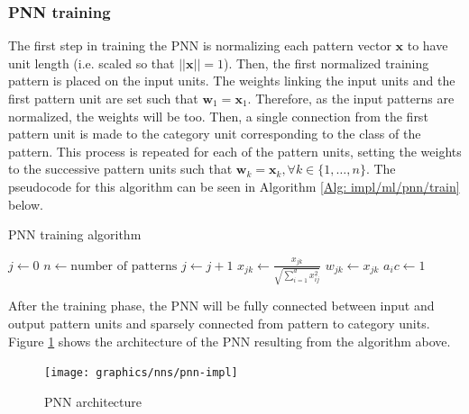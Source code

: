 	\subsubsection*{PNN training}
	The first step in training the PNN is normalizing each pattern vector $\mathbf{x}$ to have unit length (i.e. scaled so that $\vert\vert \mathbf{x}\vert\vert = 1$). Then, the first normalized training pattern is placed on the input units. The weights linking the input units and the first pattern unit are set such that $\mathbf{w}_1 = \mathbf{x}_1$. Therefore, as the input patterns are normalized, the weights will be too. Then, a single connection from the first pattern unit is made to the category unit corresponding to the class of the pattern. This process is repeated for each of the pattern units, setting the weights to the successive pattern units such that $\mathbf{w}_k=\mathbf{x}_k, \forall k \in \{1,\dots,n \}$. The pseudocode for this algorithm can be seen in Algorithm \ref{Alg: impl/ml/pnn/train} below.
	\begin{algorithm}[H]
		\caption{PNN training algorithm}
		\label{Alg: impl/ml/pnn/train}
		\begin{algorithmic}
				\State $j \gets 0$
				\State $n \gets \text{number of patterns}$ 
				\Do
					\State $j \gets j + 1$
					\State $x_{jk} \gets \frac{x_{jk}}{\sqrt{\sum_{i=1}^{d}x_{ij}^2}}$ 
					\State $w_{jk} \gets x_{jk}$ 
						\State $a_ic \gets 1$
					\EndIf
			\EndProcedure
		\end{algorithmic}
	\end{algorithm}
	After the training phase, the PNN will be fully connected between input and output pattern units and sparsely connected from pattern to category units. Figure \ref{Fig: impl/ml/pnn/architecture} shows the architecture of the PNN resulting from the algorithm above.
	\begin{figure}[H]
		\centering
		\texttt{[image: graphics/nns/pnn-impl]}
		\caption{PNN architecture}
		\label{Fig: impl/ml/pnn/architecture}
	\end{figure}
